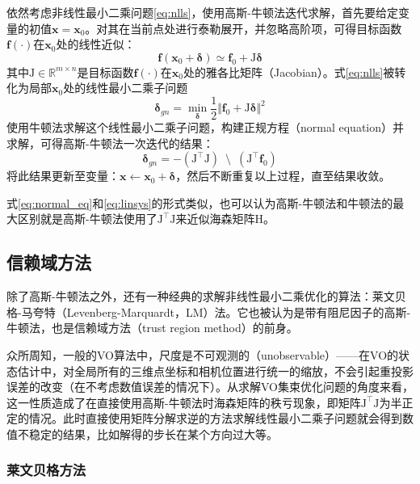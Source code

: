 依然考虑非线性最小二乘问题\eqref{eq:nlls}，使用高斯-牛顿法迭代求解，首先要给定变量的初值$\bm{x}=\bm{x}_0$。对其在当前点处进行泰勒展开，并忽略高阶项，可得目标函数$\mathbf{f}(\cdot)$在$\bm{x}_0$处的线性近似：
\begin{equation}
    \mathbf{f}(\bm{x}_0+\bm{\delta}) \simeq \mathbf{f}_0 + \mathrm{J}\bm{\delta}
\end{equation}
其中$\mathrm{J}\in\mathbb{R}^{m \times n}$是目标函数$\mathbf{f}(\cdot)$在$\bm{x}_0$处的雅各比矩阵（Jacobian）。式\eqref{eq:nlls}被转化为局部$\bm{x}_0$处的线性最小二乘子问题
\begin{equation}
    \bm{\delta}_{gn} =
        \min_{\bm{\delta}} \frac{1}{2}
        \Vert \mathbf{f}_0 + \mathrm{J}\bm{\delta} \Vert^2
    \label{eq:lls}
\end{equation}
使用牛顿法求解这个线性最小二乘子问题，构建正规方程（normal equation）并求解，可得高斯-牛顿法一次迭代的结果：
\begin{equation}
    \bm{\delta}_{gn} =
        -\left( \mathrm{J}^\top\mathrm{J} \right)
        \enspace\setminus\enspace
        \left( \mathrm{J}^\top\mathbf{f}_0 \right)
    \label{eq:normal_eq}
\end{equation}
将此结果更新至变量：$\bm{x}\leftarrow\bm{x}_0+\bm{\delta}$，然后不断重复以上过程，直至结果收敛。

式\eqref{eq:normal_eq}和\eqref{eq:linsys}的形式类似，也可以认为高斯-牛顿法和牛顿法的最大区别就是高斯-牛顿法使用了$\mathrm{J}^\top\mathrm{J}$来近似海森矩阵$\mathrm{H}$。

\subsection{信赖域方法}

除了高斯-牛顿法之外，还有一种经典的求解非线性最小二乘优化的算法：莱文贝格-马夸特（Levenberg-Marquardt，LM）法。它也被认为是带有阻尼因子的高斯-牛顿法，也是信赖域方法（trust region method）的前身\citep{jorge2006numerical}。

众所周知，一般的VO算法中，尺度是不可观测的（unobservable）——在VO的状态估计中，对全局所有的三维点坐标和相机位置进行统一的缩放，不会引起重投影误差的改变（在不考虑数值误差的情况下）。从求解VO集束优化问题的角度来看，这一性质造成了在直接使用高斯-牛顿法时海森矩阵的秩亏现象，即矩阵$\mathrm{J}^\top\mathrm{J}$为半正定的情况。此时直接使用矩阵分解求逆的方法求解线性最小二乘子问题就会得到数值不稳定的结果，比如解得的步长在某个方向过大等。

\subsubsection*{莱文贝格方法}

